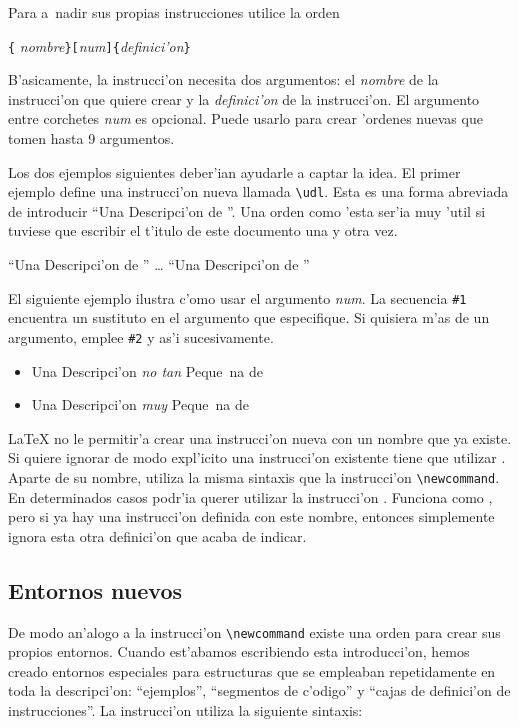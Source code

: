Para a~nadir sus propias instrucciones utilice la orden
\begin{command}
\verb|{|%
   \emph{nombre}\verb|}[|\emph{num}\verb|]{|\emph{definici'on}\verb|}|
\end{command}
\noindent B'asicamente, la instrucci'on necesita dos argumentos: el
\emph{nombre} de la instrucci'on que quiere crear y la
\emph{definici'on} de la instrucci'on. El argumento entre corchetes
\emph{num} es opcional. Puede usarlo para crear 'ordenes nuevas que
tomen hasta 9 argumentos.

Los dos ejemplos siguientes deber'ian ayudarle a captar la idea. El
primer ejemplo define una instrucci'on nueva llamada
\verb|\udl|. Esta es una forma abreviada de introducir ``Una
Descripci'on de \LaTeXe''. Una orden como 'esta ser'ia muy 'util si
tuviese que escribir el t'itulo de este documento una y otra vez.

\begin{example}
\newcommand{\udl}
    {Una Descripci'on de \LaTeXe}
``\udl'' \ldots{} ``\udl''
\end{example}

El siguiente ejemplo ilustra c'omo usar el argumento \emph{num}. La
secuencia \verb|#1| encuentra un sustituto en el argumento que
especifique. Si quisiera m'as de un argumento, emplee \verb|#2| y as'i
sucesivamente.

\begin{example}
\newcommand{\txsit}[1]
    {Una Descripci'on \emph{#1}
     Peque~na de \LaTeXe}
\begin{itemize}
\item \txsit{no tan}
\item \txsit{muy}
\end{itemize}
\end{example}

\LaTeX{} no le permitir'a crear una instrucci'on nueva con un nombre
que ya existe. Si quiere ignorar de modo expl'icito una instrucci'on
existente tiene que utilizar . Aparte de su nombre,
utiliza la misma sintaxis que la instrucci'on \verb|\newcommand|. En
determinados casos podr'ia querer utilizar la instrucci'on
. Funciona como , pero si ya hay una
instrucci'on definida con este nombre, entonces \LaTeXe{} simplemente
ignora esta otra definici'on que acaba de indicar.


\subsection{Entornos nuevos}
De modo an'alogo a la instrucci'on \verb|\newcommand| existe una orden
para crear sus propios entornos. Cuando est'abamos escribiendo esta
introducci'on, hemos creado entornos especiales para estructuras que
se empleaban repetidamente en toda la descripci'on: ``ejemplos'',
``segmentos de c'odigo'' y ``cajas de definici'on de instrucciones''.
La instrucci'on  utiliza la siguiente sintaxis:

